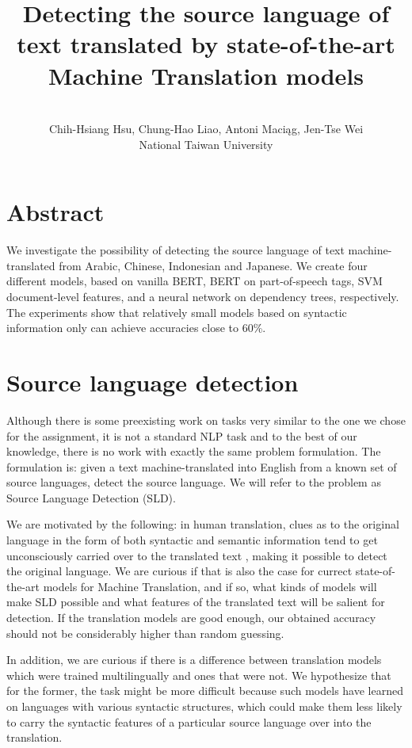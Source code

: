 \documentclass[twocolumn]{article}
\title{{\Huge \textbf{Detecting the source language of text translated by state-of-the-art Machine Translation models}} \\ }
\author{ \\ Chih-Hsiang Hsu, Chung-Hao Liao, Antoni Maciąg, Jen-Tse Wei \\ National Taiwan University}
\date{}
\begin{document}
\maketitle
\section*{Abstract}

We investigate the possibility of detecting the source language of text machine-translated from Arabic, Chinese, Indonesian and Japanese. We create four different models, based on vanilla BERT, BERT on part-of-speech tags, SVM document-level features, and a neural network on dependency trees, respectively. The experiments show that relatively small models based on syntactic information only can achieve accuracies close to 60\%.

\section*{Source language detection}

Although there is some preexisting work on tasks very similar to the one we chose for the assignment, it is not a standard NLP task and to the best of our knowledge, there is no work with exactly the same problem formulation. The formulation is: given a text machine-translated into English from a known set of source languages, detect the source language. We will refer to the problem as Source Language Detection (SLD).

We are motivated by the following: in human translation, clues as to the original language in the form of both syntactic and semantic information tend to get unconsciously carried over to the translated text \cite{literary}, making it possible to detect the original language. We are curious if that is also the case for currect state-of-the-art models for Machine Translation, and if so, what kinds of models will make SLD possible and what features of the translated text will be salient for detection. If the translation models are good enough, our obtained accuracy should not be considerably higher than random guessing.

In addition, we are curious if there is a difference between translation models which were trained multilingually and ones that were not. We hypothesize that for the former, the task might be more difficult because such models have learned on languages with various syntactic structures, which could make them less likely to carry the syntactic features of a particular source language over into the translation.
\end{document}
